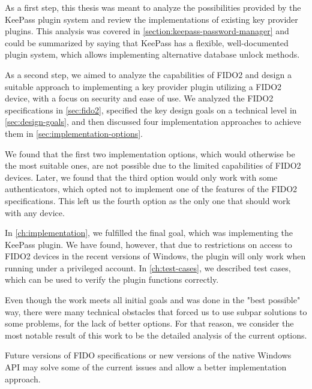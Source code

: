 As a first step, this thesis was meant to analyze the possibilities provided by the
KeePass plugin system and review the implementations of existing key provider plugins. This
analysis was covered in \autoref{section:keepass-password-manager} and could be summarized by
saying that KeePass has a flexible, well-documented plugin system, which allows implementing
alternative database unlock methods.

As a second step, we aimed to analyze the capabilities of FIDO2 and design a suitable approach
to implementing a key provider plugin utilizing a FIDO2 device, with a focus on security and ease of use.
We analyzed the FIDO2 specifications in \autoref{sec:fido2}, specified the key design goals on
a technical level in \autoref{sec:design-goals}, and then discussed four implementation approaches
to achieve them in \autoref{sec:implementation-options}.

We found that the first two implementation options, which would otherwise be the most suitable ones,
are not possible due to the limited capabilities of FIDO2 devices. Later, we found that the
third option would only work with some authenticators, which opted not to implement one of
the features of the FIDO2 specifications. This left us the fourth option as the only one
that should work with any device.

In \autoref{ch:implementation}, we fulfilled the final goal, which was implementing
the KeePass plugin. We have found, however, that due to restrictions on access to FIDO2
devices in the recent versions of Windows, the plugin will only work when running
under a privileged account. In \autoref{ch:test-cases}, we described test cases,
which can be used to verify the plugin functions correctly.

Even though the work meets all initial goals and was done in the "best possible" way,
there were many technical obstacles that forced us to use subpar solutions to some
problems, for the lack of better options. For that reason, we consider the most
notable result of this work to be the detailed analysis of the current options.

Future versions of FIDO specifications or new versions of the native Windows API may solve
some of the current issues and allow a better implementation approach.
